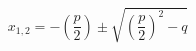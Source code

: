 \documentclass[14pt]{article}
\begin{document}
\pagestyle{empty}
\[ x_{1,2} = - \left(\frac{p}{2}\right) \pm \sqrt{ \left( \frac{p}{2} \right)^2 - q} \]
\end{document}
